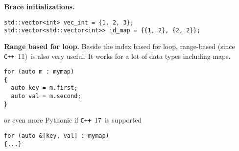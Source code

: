 \documentclass[openany]{book}
\newcommand{\cpp}{{\tt C++}}
\begin{document}
{\bf Brace initializations.}
\begin{lstlisting}
std::vector<int> vec_int = {1, 2, 3};
std::vector<std::vector<int>> id_map = {{1, 2}, {2, 2}};
\end{lstlisting}

{\bf Range based for loop.} Beside the index based for loop, range-based (since \cpp\ 11)\ is also very useful. It works for a lot of data types including maps.
\begin{lstlisting}
for (auto m : mymap)
{
  auto key = m.first;
  auto val = m.second;
}
\end{lstlisting}
or even more Pythonic if \cpp\ 17\ is supported
\begin{lstlisting}
for (auto &[key, val] : mymap)
{...}
\end{lstlisting}

\end{document}
